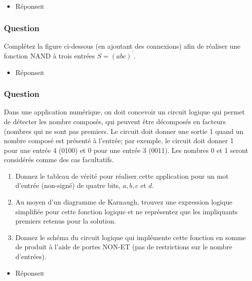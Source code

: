 \documentclass[11pt]{article}
\begin{document}
\begin{itemize}
\item Réponse\hfill{}\textsc{r}
\label{sec:orgd8b0288}
\end{itemize}

\subsubsection*{Question}
\label{sec:org1181c5c}
Complétez la figure ci-dessous (en ajoutant des connexions) afin de
  réaliser une  fonction NAND à trois entrées \(S = (a b c)^\prime\).
  \begin{center}

\end{center}

\begin{itemize}
\item Réponse\hfill{}\textsc{r}
\label{sec:orgf60cbce}
\end{itemize}

\subsubsection*{Question}
\label{sec:org6a23f42}
Dans une application numérique, on doit concevoir un circuit logique
qui permet de détecter les nombre composés, qui peuvent être
décomposés en facteurs (nombres qui ne sont pas premiers. Le circuit
doit donner une sortie 1 quand un nombre composé est présenté à
l'entrée; par exemple, le circuit doit donner 1 pour une entrée 4
(0100) et 0 pour une entrée 3 (0011). Les nombres 0 et 1 seront
considérés comme des cas facultatifs.

\begin{enumerate}
\item Donnez le tableau de vérité pour réaliser cette application pour
un mot d'entrée (non-signé) de quatre bits, \(a, b, c\) et \(d\).

\item Au moyen d'un diagramme de Karnaugh, trouvez une expression
logique simplifiée pour cette fonction logique et ne représentez
que les impliquants premiers retenus pour la solution.

\item Donnez le schéma du circuit logique qui implémente cette fonction
en somme de produit à l'aide de portes NON-ET (pas de restrictions
sur le nombre d'entrées).
\end{enumerate}

\begin{itemize}
\item Réponse\hfill{}\textsc{r}
\label{sec:org7a9cffd}
\end{itemize}
\end{document}
